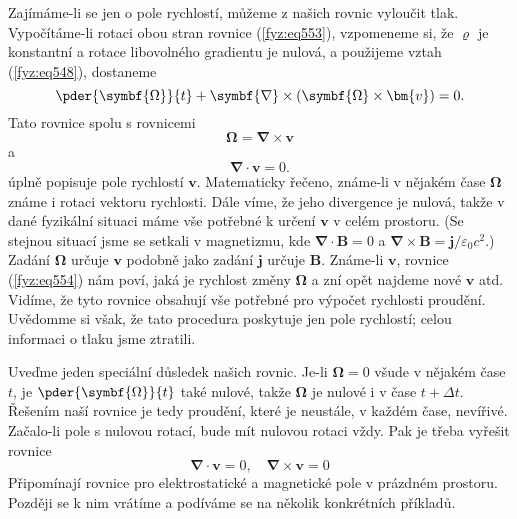     Zajímáme-li se jen o pole rychlostí, můžeme z našich rovnic vyloučit tlak. Vypočítáme-li rotaci 
    obou stran rovnice (\ref{fyz:eq553}), vzpomeneme si, že \(\varrho\) je konstantní a rotace 
    libovolného gradientu je nulová, a použijeme vztah (\ref{fyz:eq548}), dostaneme
    \begin{equation}\label{fyz:eq554}
      \pder{\symbf{\Omega}}{t} + \symbf{\nabla}\times(\symbf{\Omega}\times\bm{v}) = 0.
    \end{equation}
    Tato rovnice spolu s rovnicemi
    \begin{equation}\label{fyz:eq555}
      \symbf{\Omega} = \symbf{\nabla}\times\bm{v}
    \end{equation}
    a
    \begin{equation}\label{fyz:eq556}
      \symbf{\nabla}\cdot\bm{v} = 0.
    \end{equation}
    úplně popisuje pole rychlostí \(\bm{v}\). Matematicky řečeno, známe-li v nějakém čase 
    \(\symbf{\Omega}\) známe i rotaci vektoru rychlosti. Dále víme, že jeho divergence je nulová, 
    takže v dané fyzikální situaci máme vše potřebné k určení \(\bm{v}\) v celém prostoru. (Se 
    stejnou situací jsme se setkali v magnetizmu, kde \(\symbf{\nabla}\cdot\bm{B}=0\) a 
    \(\symbf{\nabla}\times\bm{B}=\bm{j}/\varepsilon_0c^2\).) Zadání \(\symbf{\Omega}\) určuje 
    \(\bm{v}\) podobně jako zadání \(\bm{j}\) určuje \(\bm{B}\). Známe-li \(\bm{v}\), rovnice 
    (\ref{fyz:eq554}) nám poví, jaká je rychlost změny \(\symbf{\Omega}\) a zní opět najdeme nové 
    \(\bm{v}\) atd. Vidíme, že tyto rovnice obsahují vše potřebné pro výpočet rychlosti proudění. 
    Uvědomme si však, že tato procedura poskytuje jen pole rychlostí; celou informaci o tlaku jsme 
    ztratili. 
    
    Uveďme jeden speciální důsledek našich rovnic. Je-li \(\symbf{\Omega}=0\) všude v nějakém čase 
    \(t\), je \(\pder{\symbf{\Omega}}{t}\) také nulové, takže \(\symbf{\Omega}\) je nulové i v čase 
    \(t + \Delta t\). Řešením naší rovnice je tedy proudění, které je neustále, v každém čase, 
    nevířivé. Začalo-li pole s nulovou rotací, bude mít nulovou rotaci vždy. Pak je třeba vyřešit 
    rovnice
    \begin{equation*}
      \symbf{\nabla}\cdot\bm{v} = 0, \quad \symbf{\nabla}\times\bm{v} = 0
    \end{equation*}
    Připomínají rovnice pro elektrostatické a magnetické pole v prázdném prostoru. Později se k nim 
    vrátíme a podíváme se na několik konkrétních příkladů.
    
